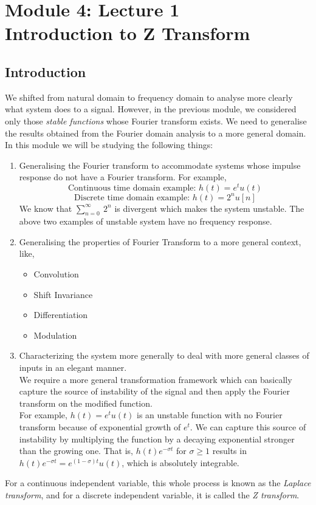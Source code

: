\section{Module 4: Lecture 1\\Introduction to Z Transform}


\subsection{Introduction}
We shifted from natural domain to frequency domain to analyse more clearly what system does to a signal. However, in the previous module, we considered only those \textit{stable functions} whose Fourier transform exists. We need to generalise the results obtained from the Fourier domain analysis to a more general domain.
In this module we will be studying the following things:
\begin{enumerate}
\item Generalising the Fourier transform to accommodate systems whose impulse response do not have a Fourier transform. For example,
\[
\text{Continuous time domain example: } h(t) = e^{t}u(t)
\]
\[
\text{Discrete time domain example: } h(t) = 2^{n}u[n]
\]
We know that $\sum_{n=0}^{\infty}\ 2^{n}$ is divergent which makes the system unstable. The above two examples of unstable system have no frequency response.
\item Generalising the properties of Fourier Transform to a more general context, like,
\begin{itemize}
\item Convolution
\item Shift Invariance
\item Differentiation
\item Modulation
\end{itemize}
\item Characterizing the system more generally to deal with more general classes of inputs in an elegant manner.\\
We require a more general transformation framework which can basically capture the source of instability of the signal and then apply the Fourier transform on the modified function.\\
For example, $h(t) = e^{t}u(t)$ is an unstable function with no Fourier transform because of exponential growth of $e^{t}$. We can capture this source of instability by multiplying the function by a decaying exponential stronger than the growing one. 
That is, $h(t)e^{-\sigma t}$  for $\sigma \geq 1$ results in $h(t)e^{-\sigma t} = e^{(1-\sigma)t}u(t)$, which is absolutely integrable.
\end{enumerate}
For a continuous independent variable, this whole process is known as the \textit{Laplace transform}, and for a discrete independent variable, it is called the \textit{Z transform}.

